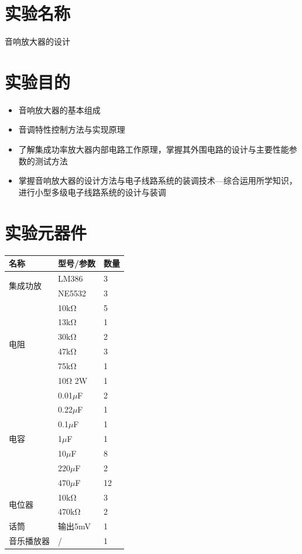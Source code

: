 \documentclass[a4paper,11pt,UTF8]{article}
\numberwithin{equation}{subsection}
\begin{document}
\tableofcontents\newpage
\section{实验名称}
音响放大器的设计
\section{实验目的}
\begin{itemize}
	\item 音响放大器的基本组成
	\item 音调特性控制方法与实现原理
	\item 了解集成功率放大器内部电路工作原理，掌握其外围电路的设计与主要性能参数的测试方法
	\item 掌握音响放大器的设计方法与电子线路系统的装调技术---综合运用所学知识，进行小型多级电子线路系统的设计与装调
\end{itemize}
\section{实验元器件}

\begin{table}[H]
	\centering
	\begin{tabular}{|p{}|p{}|p{}|}
		\hline
		名称 & 型号/参数 & 数量\\
		\hline
		\multirow{2}{*}{集成功放} & LM386
		 & 3\\
		 \cline{2-3}
		& NE5532 & 3\\
		\hline
		\multirow{6}{*}{电阻} & 10$\mathrm{k\Omega}$ & 5 \\
		\cline{2-3}
		 & 13$\mathrm{k\Omega}$ & 1 \\
		\cline{2-3}
		 & 30$\mathrm{k\Omega}$ & 2 \\
		\cline{2-3}
		 & 47$\mathrm{k\Omega}$ & 3 \\
		\cline{2-3}
		 & 75$\mathrm{k\Omega}$ & 1 \\
		\cline{2-3}
		 & 10$\mathrm{\Omega}$ 2W & 1 \\
		\hline
		\multirow{7}{*}{电容} & 0.01$\mu$F & 2 \\
		\cline{2-3}
		& 0.22$\mu$F & 1 \\
		\cline{2-3}
		&0.1$\mu$F & 1 \\
		\cline{2-3}
		& 1$\mu$F & 1\\
		\cline{2-3}
		& 10$\mu$F & 8 \\
		\cline{2-3}
		& 220$\mu$F & 2 \\
		\cline{2-3}
		& 470$\mu$F & 12 \\
		\cline{2-3}
		\hline 	
		\multirow{2}{*}{电位器} & 10$\mathrm{k\Omega}$ & 	3\\
		\cline{2-3}
		& 470$\mathrm{k\Omega}$ & 	2\\
		\hline
		话筒&输出5mV&1\\
		\hline
		音乐播放器&/&1\\
		\hline
	\end{tabular}
\end{table}
\end{document}
